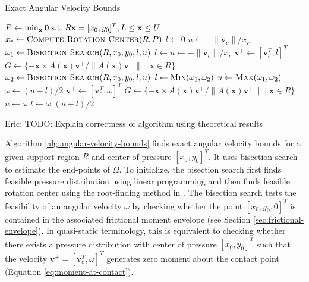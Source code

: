 \documentclass[conference]{IEEEtran}
\makeatletter
\def\BState{\State\hskip-\ALG@thistlm}
\newcommand{\EH}[1]{{\color{blue} {Eric: {#1}}  }}
\makeatother
\begin{document}
\begin{algorithm}
\caption{Exact Angular Velocity Bounds}\label{alg:angular-velocity-bounds}
\begin{algorithmic}[1]
 \Return {$[0,0]$}
\EndIf
\State $P \gets \min_\mathbf{x} \mathbf{0} \text{\;s.t.\;} R\mathbf{x} = [x_0,y_0]^T,  L \leq \mathbf{x} \leq U$
\State $x_r \gets \Call{Compute Rotation Center}{R,P}$
\State $l \gets 0$
\State $u \gets -\lVert\mathbf{v}_c\rVert/x_r$
\State $\omega_1 \gets \Call{Bisection Search}{R,x_0,y_0,l,u}$
\State $l \gets u \gets -\lVert\mathbf{v}_c\rVert/x_r$
\Do%
\State $\mathbf{v}^+ \gets [\mathbf{v}_c^T, l]^T$
\State $G \gets \{-\mathbf{x}\times A(\mathbf{x})\mathbf{v}^+ / \lVert A(\mathbf{x})\mathbf{v}^+ \rVert \;|\; \mathbf{x} \in R\}$
\State $\omega_2 \gets \Call{Bisection Search}{R,x_0,y_0,l,u}$
\State $l \gets \Call{Min}{\omega_1,\omega_2}$
\State $u \gets \Call{Max}{\omega_1,\omega_2}$
\State \Return {$[l, u]$}
\EndFunction
% 
\State $\omega \gets (u+l)/2$
\State $\mathbf{v}^+ \gets [\mathbf{v}_c^T, \omega]^T$
\State $G \gets \{-\mathbf{x}\times A(\mathbf{x})\mathbf{v}^+ / \lVert A(\mathbf{x})\mathbf{v}^+ \rVert \;|\; \mathbf{x} \in R\}$
\State $u \gets \omega$
\Else{} 
\State $l \gets \omega$
\EndIf
\EndWhile
\State \Return $(u+l)/2$
\EndFunction
\end{algorithmic}
\end{algorithm}

\EH{TODO: Explain correctness of algorithm using theoretical results}

Algorithm \ref{alg:angular-velocity-bounds} finds exact angular
velocity bounds for a given support region $R$ and center of pressure
$[x_0,y_0]^T$. It uses bisection search to estimate the end-points of
$\Omega$. To initialize, the bisection search first finds feasible
pressure distribution using linear programming and then finds feasible
rotation center using the root-finding method in \cite{Mason1982}. The
bisection search tests the feasibility of an angular velocity $\omega$
by checking whether the point $[x_0,y_0,0]^T$ is contained in the
associated frictional moment envelope (see Section
\ref{sec:frictional-envelope}). In quasi-static terminology, this is
equivalent to checking whether there exists a pressure distribution
with center of pressure $[x_0,y_0]^T$ such that the velocity
$\mathbf{v}^+ = [\mathbf{v}_c^T, \omega]^T$ generates zero moment
about the contact point (Equation \ref{eq:moment-at-contact}).
\end{document}
